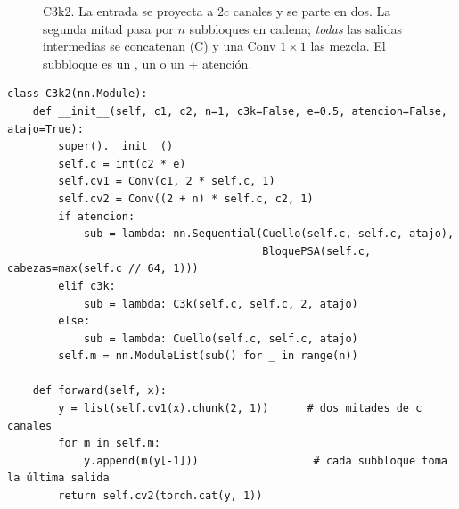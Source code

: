 \begin{figure}[H]
\centering
{}
\caption{C3k2. La entrada se proyecta a $2c$ canales y se parte en dos. La
segunda mitad pasa por $n$ subbloques en cadena; \emph{todas} las salidas
intermedias se concatenan (C) y una Conv $1{\times}1$ las mezcla. El subbloque
es un , un  o un  + atención.}
\label{fig:c3k2}
\end{figure}

\begin{lstlisting}[style=py]
class C3k2(nn.Module):
    def __init__(self, c1, c2, n=1, c3k=False, e=0.5, atencion=False, atajo=True):
        super().__init__()
        self.c = int(c2 * e)
        self.cv1 = Conv(c1, 2 * self.c, 1)
        self.cv2 = Conv((2 + n) * self.c, c2, 1)
        if atencion:
            sub = lambda: nn.Sequential(Cuello(self.c, self.c, atajo),
                                        BloquePSA(self.c, cabezas=max(self.c // 64, 1)))
        elif c3k:
            sub = lambda: C3k(self.c, self.c, 2, atajo)
        else:
            sub = lambda: Cuello(self.c, self.c, atajo)
        self.m = nn.ModuleList(sub() for _ in range(n))

    def forward(self, x):
        y = list(self.cv1(x).chunk(2, 1))      # dos mitades de c canales
        for m in self.m:
            y.append(m(y[-1]))                  # cada subbloque toma la última salida
        return self.cv2(torch.cat(y, 1))
\end{lstlisting}

